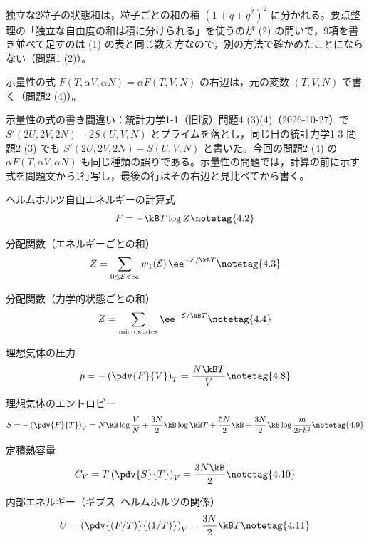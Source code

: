 \documentclass[uplatex,dvipdfmx,a4paper,11pt]{jsarticle}
\begin{document}
\matome
\begin{saitenichiran}
\end{saitenichiran}
\begin{daiji}
  \item 独立な2粒子の状態和は，粒子ごとの和の積 $(1+q+q^{2})^{2}$ に分かれる。要点整理の「独立な自由度の和は積に分けられる」を使うのが (2) の問いで，9項を書き並べて足すのは (1) の表と同じ数え方なので，別の方法で確かめたことにならない（問題1 (2)）。
  \item 示量性の式 $F(T,\alpha V,\alpha N)=\alpha F(T,V,N)$ の右辺は，元の変数 $(T,V,N)$ で書く（問題2 (4)）。
\end{daiji}
\begin{maemo}
  \item 示量性の式の書き間違い：統計力学1-1（旧版）問題4 (3)(4)（2026-10-27）で $S'(2U,2V,2N)-2S(U,V,N)$ とプライムを落とし，同じ日の統計力学1-3 問題2 (3) でも $S'(2U,2V,2N)-S(U,V,N)$ と書いた。今回の問題2 (4) の $\alpha F(T,\alpha V,\alpha N)$ も同じ種類の誤りである。示量性の問題では，計算の前に示す式を問題文から1行写し，最後の行はその右辺と見比べてから書く。
\end{maemo}

\youtenseiri
\begin{noteshikilist}
  \item ヘルムホルツ自由エネルギーの計算式 %
  \[F=-\kB T\log Z \notetag{4.2}\]
  \item 分配関数（エネルギーごとの和） %
  \[Z=\sum_{0\le\mathcal{E}<\infty}w_{1}(\mathcal{E})\,\ee^{-\mathcal{E}/\kB T} \notetag{4.3}\]
  \item 分配関数（力学的状態ごとの和） %
  \[Z=\sum_{\text{microstates}}\ee^{-\mathcal{E}/\kB T} \notetag{4.4}\]
  \item 理想気体の圧力 %
  \[p=-\left(\pdv{F}{V}\right)_{T}=\frac{N\kB T}{V} \notetag{4.8}\]
  \item 理想気体のエントロピー %
  \[S=-\left(\pdv{F}{T}\right)_{V}=N\kB\log\frac{V}{N}+\frac{3N}{2}\kB\log\kB T+\frac{5N}{2}\kB+\frac{3N}{2}\kB\log\frac{m}{2\pi\hbar^{2}} \notetag{4.9}\]
  \item 定積熱容量 %
  \[C_{V}=T\left(\pdv{S}{T}\right)_{V}=\frac{3N\kB}{2} \notetag{4.10}\]
  \item 内部エネルギー（ギブス--ヘルムホルツの関係） %
  \[U=\left(\pdv{(F/T)}{(1/T)}\right)_{V}=\frac{3N}{2}\kB T \notetag{4.11}\]
\end{noteshikilist}
\end{document}
